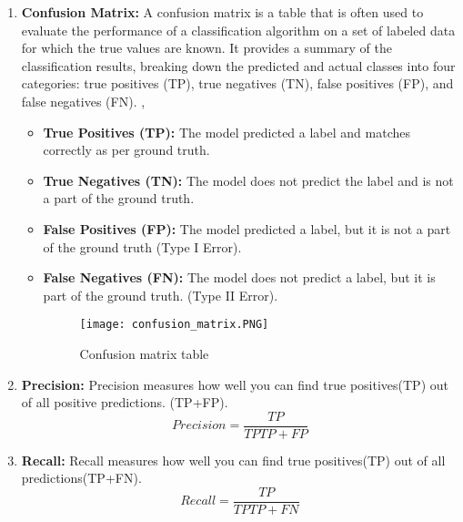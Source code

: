 \begin{enumerate}
    \item \textbf{Confusion Matrix: }A confusion matrix is a table that is often used to evaluate the performance of a classification algorithm on a set of labeled data for which the true values are known. It provides a summary of the classification results, breaking down the predicted and actual classes into four categories: true positives (TP), true negatives (TN), false positives (FP), and false negatives (FN). \cite{padilla2020survey}, \cite{li2019analysis}
    \begin{itemize}
        \item \textbf{True Positives (TP): } The model predicted a label and matches correctly as per ground truth.\\
        \item \textbf{True Negatives (TN): } The model does not predict the label and is not a part of the ground truth.\\
        \item  \textbf{False Positives (FP): } The model predicted a label, but it is not a part of the ground truth (Type I Error).\\
        \item \textbf{False Negatives (FN): } The model does not predict a label, but it is part of the ground truth. (Type II Error).
        \begin{figure}[H]
            \centering
            \texttt{[image: confusion\_matrix.PNG]}
            \caption{Confusion matrix table}
            \label{fig:Confusion_Matrix}
        \end{figure}
    \end{itemize}
    \item \textbf{Precision: } Precision measures how well you can find true positives(TP) out of all positive predictions. (TP+FP).
    $$Precision=\frac{TP}{TPTP+FP}$$

    \item \textbf{Recall: } Recall measures how well you can find true positives(TP) out of all predictions(TP+FN).
    $$Recall=\frac{TP}{TPTP+FN}$$
    
  
\end{enumerate}


